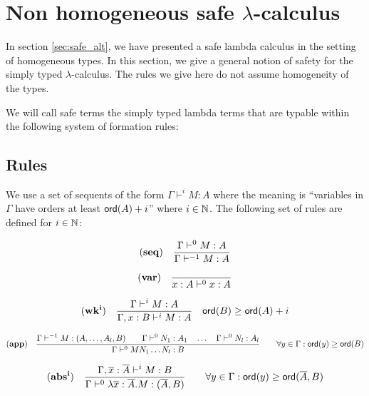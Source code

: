 \section{Non homogeneous safe $\lambda$-calculus}

In section \ref{sec:safe_alt}, we have presented a safe lambda
calculus in the setting of homogeneous types. In this section, we
give a general notion of safety for the simply typed
$\lambda$-calculus. The rules we give here do not assume homogeneity
of the types.

We will call safe terms the simply typed lambda terms that are
typable within the following system of formation rules:

\subsection{Rules}

 We use a set of sequents of the form $\Gamma \vdash^{i} M :
A$ where the meaning is ``variables in $\Gamma$ have orders at least
${\sf ord}(A)+i$'' where $i \in \mathbb{N}$. The following set of rules are
defined for $i \in \mathbb{N}$:

$$ \mathbf{(seq)} \quad \frac{\displaystyle \Gamma \vdash^0 M : A}{\Gamma \vdash^{-1} M : A} $$

$$ \mathbf{(var)} \quad  \frac{\displaystyle }{x : A\vdash^{0} x : A} $$

$$ \mathbf{(wk^i)} \quad  \frac{\displaystyle \Gamma \vdash^i M : A}{\Gamma , x : B \vdash^i M : A} \quad {\sf ord}(B) \geq {\sf ord}(A) + i $$

$$ \mathbf{(app)} \quad  \frac{\displaystyle \Gamma \vdash^{-1} M : (A,\ldots,A_l,B)
                                        \qquad \Gamma \vdash^{0} N_1 : A_1
                                        \quad \ldots \quad \Gamma \vdash^{0} N_l : A_l  }{\Gamma  \vdash^0 M N_1 \ldots N_l : B}
                                    \qquad
                                   \forall y \in \Gamma : {\sf ord}(y) \geq {\sf ord}(B)$$

$$ \mathbf{(abs^i)} \quad  \frac{\displaystyle \Gamma, \overline{x} : \overline{A} \vdash^{i} M : B}{\Gamma  \vdash^{0} \lambda \overline{x} : \overline{A} . M : (\overline{A},B)} \qquad
                                   \forall y \in \Gamma : {\sf ord}(y) \geq {\sf ord}(\overline{A},B)$$



